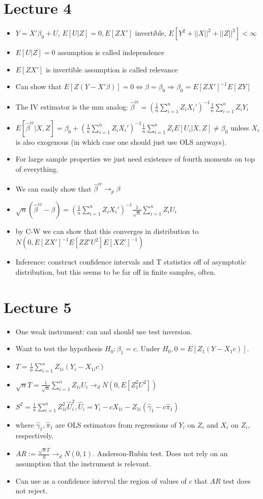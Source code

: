 \documentclass[11pt]{article} %
\begin{document}
\section{Lecture 4}
\begin{itemize}
\item $Y = X'\beta_0 +U$, $E[U|Z] = 0, E[ZX'] $ invertible, $E[Y^2 + ||X||^2 + ||Z||^2]<\infty$
\item $E[U|Z] = 0$ assumption is called independence
\item $E[ZX'] $ is invertible assumption is called relevance
\item Can show that $E[Z(Y-X'\beta)] = 0 \iff \beta = \beta_0 \Rightarrow \beta_0 = E[ZX']^{-1}E[ZY]$ 
\item The IV estimator is the mm analog: $\hat{\beta}^{iv} = \left( \frac{1}{n}\sum_{i=1}^n Z_i X_i'\right)^{-1}\frac{1}{n}\sum_{i=1}^{n} Z_iY_i$
\item $E[\hat{\beta}^{iv}|X,Z] = \beta_0 + \left( \frac{1}{n}\sum_{i=1}^nZ_iX_i'\right)^{-1}\frac{1}{n}\sum_{i=1}^n Z_iE[U_i|X,Z] \neq \beta_0$ unless $X_i$ is also exogenous (in which case one should just use OLS anyways).
\item For large sample properties we just need existence of fourth moments on top of everything.
\item We can easily show that $\hat{\beta}^{iv}\rightarrow_p \beta$
\item $\sqrt{n}(\hat{\beta}^{iv} - \beta) = \left( \frac{1}{n}\sum_{i=1}^nZ_iX_i'\right)^{-1}\frac{1}{\sqrt{n}}\sum_{i=1}^n Z_iU_i$
\item by C-W we can show that this converges in distribution to $N(0,E[ZX']^{-1}E[ZZ'U^2]E[XZ']^{-1})$
\item Inference: construct confidence intervals and T statistics off of asymptotic distribution, but this seems to be far off in finite samples, often.
\end{itemize}
\section{Lecture 5}
\begin{itemize}
\item One weak instrument: can and should use test inversion.
\item Want to test the hypothesis $H_0: \beta_1 = c$. Under $H_0, 0 = E[Z_1(Y - X_1c)]$.
\item $T = \frac{1}{n} \sum_{i=1}^n Z_{1i}(Y_i - X_{1i}c)$
\item $\sqrt{n}T = \frac{1}{\sqrt{n}}\sum_{i=1}^n Z_{1i}U_i \rightarrow_d N(0,E[Z_1^2U^2])$
\item $S^2 = \frac{1}{n}\sum_{i=1}^n Z_{1i}^2\hat{U}_i^2, \hat{U}_i = Y_i - cX_{1i} - Z_{1i}(\hat{\gamma}_1 - c\hat{\pi}_1)$
\item where $\hat{\gamma}_1,\hat{\pi}_1 $ are OLS estimators from regressions of $Y_i$ on $Z_i$ and $X_i$ on $Z_i$, respectively.
\item $AR:= \frac{\sqrt{n}T}{S} \rightarrow_d N(0,1)$. Anderson-Rubin test. Does not rely on an assumption that the instrument is relevant.
\item Can use as a confidence interval the region of values of $c$ that $AR$ test does not reject.
\end{itemize}
\end{document}
